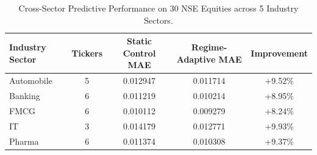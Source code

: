 \begin{table}[t]
\centering
\caption{Cross-Sector Predictive Performance on 30 NSE Equities across 5 Industry Sectors.}
\label{tab:sector_breakdown}
\begin{tabular}{lcccc}
\hline
\textbf{Industry Sector} & \textbf{Tickers} & \textbf{Static Control MAE} & \textbf{Regime-Adaptive MAE} & \textbf{Improvement} \\
\hline
Automobile & 5 & 0.012947 & 0.011714 & +9.52\% \\
Banking & 6 & 0.011219 & 0.010214 & +8.95\% \\
FMCG & 6 & 0.010112 & 0.009279 & +8.24\% \\
IT & 3 & 0.014179 & 0.012771 & +9.93\% \\
Pharma & 6 & 0.011374 & 0.010308 & +9.37\% \\
\hline
\end{tabular}
\end{table}
